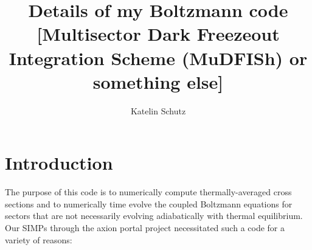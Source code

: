 \documentclass[superscriptaddress,nofootinbib,notitlepage,onecolumn]{revtex4-1}
\begin{document}
\title{Details of my Boltzmann code [Multisector Dark Freezeout Integration Scheme (MuDFISh) or something else]}%
\author{Katelin Schutz}
\nopagebreak
\maketitle \nopagebreak
\section{Introduction}
The purpose of this code is to numerically compute thermally-averaged cross sections and to numerically time evolve the coupled Boltzmann equations for sectors that are not necessarily evolving adiabatically with thermal equilibrium.
Our SIMPs through the axion portal project necessitated such a code for a variety of reasons:
\end{document}
